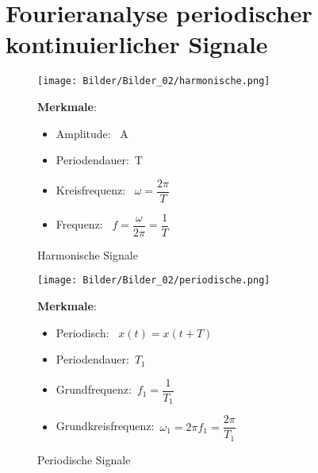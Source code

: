 \section{Fourieranalyse periodischer kontinuierlicher Signale}
\begin{figure}[H]
    \centering
    \begin{minipage}{.6\textwidth}
        \centering
        \texttt{[image: Bilder/Bilder\_02/harmonische.png]}
        \caption{Harmonische Signale}
        \label{fig:har_sig}
    \end{minipage}
    \hspace{0.6cm}
    \begin{minipage}{.35\textwidth}
    \textbf{Merkmale}:
        \begin{itemize}
            \item 
            Amplitude: \, A
            \item
            Periodendauer: \,T
            \item
            Kreisfrequenz: \, $\omega=\dfrac{2\pi}{T}$
            \item
            Frequenz: \, $f=\dfrac{\omega}{2\pi}=\dfrac{1}{T}$
        \end{itemize}
    \end{minipage}
\end{figure}

\begin{figure}[H]
    \centering
    \begin{minipage}{.6\textwidth}
        \centering
        \texttt{[image: Bilder/Bilder\_02/periodische.png]}
        \caption{Periodische Signale}
        \label{fig:Period_sig}
    \end{minipage}
    \hspace{0.6cm}
    \begin{minipage}{.35\textwidth}
        \textbf{Merkmale}:
            \begin{itemize}
                \item 
                Periodisch: \, $x(t)=x(t+T)$
                \item
                Periodendauer:\, $T_1$
                \item
                Grundfrequenz:\, $f_1=\dfrac{1}{T_1}$
                \item
                Grundkreisfrequenz:\, $\omega_1=2\pi f_1=\dfrac{2\pi}{T_1}$
            \end{itemize}
    \end{minipage}
\end{figure}

